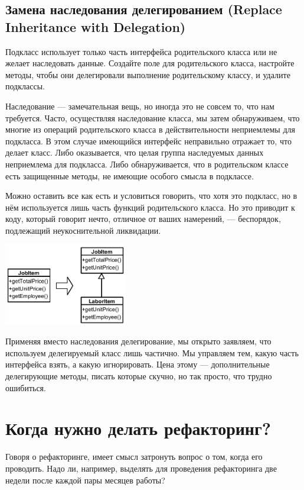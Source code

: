 \documentclass{../../text-style}
\begin{document}
\subsection{Замена наследования делегированием (Replace Inheritance with Delegation)}

Подкласс использует только часть интерфейса родительского класса или не желает наследовать данные. Создайте поле для родительского класса, настройте методы, чтобы они делегировали выполнение родительскому классу, и удалите подклассы.

Наследование --- замечательная вещь, но иногда это не совсем то, что нам требуется. Часто, осуществляя наследование класса, мы затем обнаруживаем, что многие из операций родительского класса в действительности неприемлемы для подкласса. В этом случае имеющийся интерфейс неправильно отражает то, что делает класс. Либо оказывается, что целая группа наследуемых данных неприемлема для подкласса. Либо обнаруживается, что в родительском классе есть защищенные методы, не имеющие особого смысла в подклассе.

Можно оставить все как есть и условиться говорить, что хотя это подкласс, но в нём используется лишь часть функций родительского класса. Но это приводит к коду, который говорит нечто, отличное от ваших намерений, --- беспорядок, подлежащий неукоснительной ликвидации.

\begin{center}
    \includegraphics[width=0.4\textwidth]{extractSubclass.png}
\end{center}

Применяя вместо наследования делегирование, мы открыто заявляем, что используем делегируемый класс лишь частично. Мы управляем тем, какую часть интерфейса взять, а какую игнорировать. Цена этому --- дополнительные делегирующие методы, писать которые скучно, но так просто, что трудно ошибиться.

\section{Когда нужно делать рефакторинг?}

Говоря о рефакторинге, имеет смысл затронуть вопрос о том, когда его проводить. Надо ли, например, выделять для проведения рефакторинга две недели после каждой пары месяцев работы?
\end{document}
